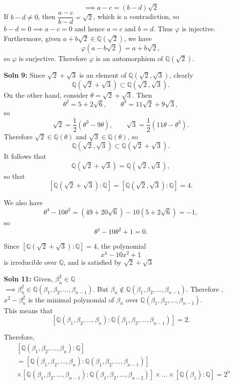 \documentclass[12pt]{article}
\begin{document}
\begin{enumerate}
\[    \]
    \[
    \implies a-c=(b-d)\sqrt2
    \]
     If $b-d \neq 0$, then $\dfrac{a-c}{b-d}=\sqrt2$, which is a contradiction, so \\ $b-d=0\implies a-c=0$ and hence $a = c$ and $b = d$. Thus $\varphi$ is injective.  
    Furthermore, given $a + b\sqrt{2} \in \mathbb{Q}(\sqrt{2})$, we have
    \[
    \varphi(a - b\sqrt{2}) = a + b\sqrt{2},
        \]
    so $\varphi$ is surjective. Therefore $\varphi$ is an automorphism of $\mathbb{Q}(\sqrt{2})$.
    \item[\bf{Soln 9}: ] Since $\sqrt{2} + \sqrt{3}$ is an element of $\mathbb{Q}(\sqrt{2}, \sqrt{3})$, clearly
    \[\mathbb{Q}(\sqrt{2} + \sqrt{3}) \subset \mathbb{Q}(\sqrt{2}, \sqrt{3}).\]
    On the other hand, consider $\theta = \sqrt{2} + \sqrt{3}$. Then
    \[
    \theta^2 = 5 + 2\sqrt{6}, \qquad \theta^3 = 11\sqrt{2} + 9\sqrt{3},
    \]
    so
    \[
    \sqrt{2} = \frac{1}{2}(\theta^3 - 9\theta), \qquad 
    \sqrt{3} = \frac{1}{2}(11\theta - \theta^3).
    \]
    Therefore $\sqrt{2} \in \mathbb{Q}(\theta)$ and $\sqrt{3} \in \mathbb{Q}(\theta)$, so
    \[
    \mathbb{Q}(\sqrt{2},\sqrt{3}) \subset \mathbb{Q}(\sqrt{2} + \sqrt{3}).
    \]
    It follows that
    \[
    \mathbb{Q}(\sqrt{2} + \sqrt{3}) = \mathbb{Q}(\sqrt{2}, \sqrt{3}),
    \]
    so that
    \[
    [\mathbb{Q}(\sqrt{2} + \sqrt{3}) : \mathbb{Q}] 
    = [\mathbb{Q}(\sqrt{2}, \sqrt{3}) : \mathbb{Q}]
    = 4.
    \]

    We also have
    \[
    \theta^4 - 10\theta^2 
    = (49 + 20\sqrt{6}) - 10(5 + 2\sqrt{6})
    = -1,
    \]
    so
    \[
    \theta^4 - 10\theta^2 + 1 = 0.
    \]

    Since $[\mathbb{Q}(\sqrt{2} + \sqrt{3}) : \mathbb{Q}] = 4$, the polynomial
    \[
    x^4 - 10x^2 + 1
    \]
    is irreducible over $\mathbb{Q}$, and is satisfied by $\sqrt{2} + \sqrt{3}$

    \item[\bf{Soln 11}: ] Given, $\beta_n^2 \in \mathbb{Q}$\\
     $\implies \beta_n^2 \in \mathbb{Q}(\beta_1,\beta_2,...,\beta_{n-1})$. But $\beta_n \notin \mathbb{Q}(\beta_1,\beta_2,...,\beta_{n-1})$. Therefore ,$x^2-\beta_n^2$ is the minimal polynomial of $\beta_n$ over $\mathbb{Q}(\beta_1,\beta_2,...,\beta_{n-1})$.\\
     This means that \[[\mathbb{Q}(\beta_1,\beta_2,...,\beta_n):\mathbb{Q}(\beta_1,\beta_2,...,\beta_{n-1})]=2.\]
     

     Therefore,\[
     \begin{aligned}
     &[\mathbb{Q}(\beta_1,\beta_2,...,\beta_n): \mathbb{Q}] \\ 
     & =[\mathbb{Q}(\beta_1,\beta_2,...,\beta_n):\mathbb{Q}(\beta_1,\beta_2,...,\beta_{n-1})] \\ &\times  [\mathbb{Q}(\beta_1,\beta_2,...,\beta_{n-1}):\mathbb{Q}(\beta_1,\beta_2,...,\beta_{n-2})] \times ...  \times [\mathbb{Q}(\beta_1): \mathbb{Q}]=2^n\\ 
      \end{aligned}
      \]


\end{enumerate}
\end{document}
